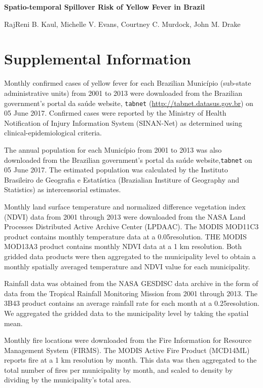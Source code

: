 \documentclass{article}
\begin{document}
\noindent
\textbf{\LARGE{Spatio-temporal Spillover Risk of Yellow Fever in Brazil}}

\bigskip
\noindent
RajReni B. Kaul, Michelle V. Evans, Courtney C. Murdock, John M. Drake
\smallskip

\section*{Supplemental Information}

Monthly confirmed cases of yellow fever for each Brazilian Munic\'{i}pio (sub-state administrative units) from 2001 to 2013 were downloaded from the Brazilian government's portal da sa\'{u}de website, \texttt{tabnet} (\url{http://tabnet.datasus.gov.br}) on 05 June 2017.
Confirmed cases were reported by the Ministry of Health Notification of Injury Information System (SINAN-Net) as determined using clinical-epidemiological criteria.

The annual population for each Munic\'{i}pio from 2001 to 2013 was also downloaded from the Brazilian government's portal da sa\'{u}de website,\texttt{tabnet} on 05 June 2017. The estimated population was calculated by the Instituto Brasileiro de Geografia e Estat\'{i}stica (Brazialian Institure of Geography and Statistics) as intercensorial estimates.

Monthly land surface temperature and normalized difference vegetation index (NDVI) data from 2001 through 2013 were downloaded from the NASA Land Processes Distributed Active Archive Center (LPDAAC). The MODIS MOD11C3 product contains monthly temperature data at a 0.05\degree resolution. THE MODIS MOD13A3 product contains monthly NDVI data at a 1 km resolution. Both gridded data products were then aggregated to the municipality level to obtain a monthly spatially averaged temperature and NDVI value for each municipality.

Rainfall data was obtained from the NASA GESDISC data archive in the form of data from the Tropical Rainfall Monitoring Mission from 2001 through 2013. The 3B43 product contains an average rainfall rate for each month at a 0.25\degree resolution. We aggregated the gridded data to the municipality level by taking the spatial mean.

Monthly fire locations were downloaded from the Fire Information for Resource Management System (FIRMS). The MODIS Active Fire Product (MCD14ML) reports fire at a 1 km resolution by month. This data was then aggregated to the total number of fires per municipality by month, and scaled to density by dividing by the municipality's total area.
\end{document}
